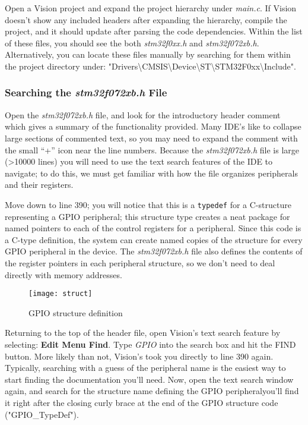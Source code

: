 \documentclass[openany,11pt,fleqn]{book} %
\begin{document}
Open a {\textmu}Vision project and expand the project hierarchy under \textit{main.c}. If {\textmu}Vision doesn't show any included headers after expanding the hierarchy, compile the project, and it should update after parsing the code dependencies. Within the list of these files, you should see the both \textit{stm32f0xx.h} and \textit{stm32f072xb.h}.  Alternatively, you can locate these files manually by searching for them within the project directory under: "Drivers\textbackslash CMSIS\textbackslash Device\textbackslash ST\textbackslash STM32F0xx\textbackslash Include". 

\subsubsection{Searching the \textit{stm32f072xb.h} File}

Open the \textit{stm32f072xb.h} file, and look for the introductory header comment which gives a summary of the functionality provided. Many IDE's like to collapse large sections of commented text, so you may need to expand the comment with the small ``+'' icon near the line numbers. Because the \textit{stm32f072xb.h} file is large (>10000 lines) you will need to use the text search features of the IDE to navigate; to do this, we must get familiar with how the file organizes peripherals and their registers.

Move down to line 390; you will notice that this is a \texttt{typedef} for a C-structure representing a GPIO peripheral; this structure type creates a neat package for named pointers to each of the control registers for a peripheral. Since this code is a C-type definition, the system can create named copies of the structure for every GPIO peripheral in the device. The \textit{stm32f072xb.h} file also defines the contents of the register pointers in each peripheral structure, so we don't need to deal directly with memory addresses.

\begin{figure}[]
    \centering\texttt{[image: struct]}
    \caption{GPIO structure definition}
    \label{struct}
\end{figure}

Returning to the top of the header file, open {\textmu}Vision's text search feature by selecting: \textbf{Edit Menu \textrightarrow Find}. Type \textit{GPIO} into the search box and hit the FIND button. More likely than not, {\textmu}Vision's took you directly to line 390 again. Typically, searching with a guess of the peripheral name is the easiest way to start finding the documentation you'll need. Now, open the text search window again, and search for the structure name defining the GPIO peripheral\textemdash you'll find it right after the closing curly brace at the end of the GPIO structure code ("GPIO\_TypeDef").
\end{document}
